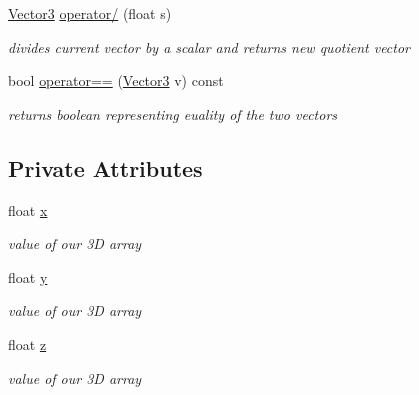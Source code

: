 \begin{DoxyCompactItemize}
\mbox{\label{classVector3_a8f6b9bba644d3933543ee8da443ebb40}} 
\hyperlink{classVector3}{Vector3} \hyperlink{classVector3_a8f6b9bba644d3933543ee8da443ebb40}{operator/} (float s)
\begin{DoxyCompactList}\small\item\em divides current vector by a scalar and returns new quotient vector \end{DoxyCompactList}\item 
\mbox{\label{classVector3_a81cbc44d5084dd8713d66264d12d0480}} 
bool \hyperlink{classVector3_a81cbc44d5084dd8713d66264d12d0480}{operator==} (\hyperlink{classVector3}{Vector3} v) const
\begin{DoxyCompactList}\small\item\em returns boolean representing euality of the two vectors \end{DoxyCompactList}\end{DoxyCompactItemize}
\subsection*{Private Attributes}
\begin{DoxyCompactItemize}
\item 
\mbox{\label{classVector3_a7e2d3237b29a2f29d7b3d8b2934e35f2}} 
float \hyperlink{classVector3_a7e2d3237b29a2f29d7b3d8b2934e35f2}{x}
\begin{DoxyCompactList}\small\item\em value of our 3D array \end{DoxyCompactList}\item 
\mbox{\label{classVector3_a86eb35a9fa2d5a49e7fad66a35fa9c13}} 
float \hyperlink{classVector3_a86eb35a9fa2d5a49e7fad66a35fa9c13}{y}
\begin{DoxyCompactList}\small\item\em value of our 3D array \end{DoxyCompactList}\item 
\mbox{\label{classVector3_aa8c9461eb24bd2c364258078811a3e9d}} 
float \hyperlink{classVector3_aa8c9461eb24bd2c364258078811a3e9d}{z}
\begin{DoxyCompactList}\small\item\em value of our 3D array \end{DoxyCompactList}\end{DoxyCompactItemize}


